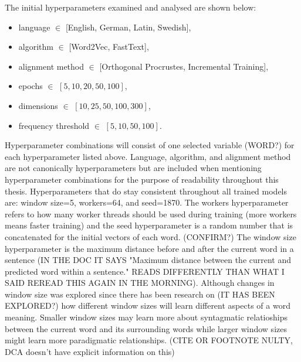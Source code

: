 


The initial hyperparameters examined and analysed are shown below:
\begin{itemize}
    \item language $\in$ [English, German, Latin, Swedish],
    \item algorithm $\in$ [Word2Vec, FastText],
    \item alignment method $\in$ [Orthogonal Procrustes, Incremental Training],
    \item epochs $\in$ $[5, 10, 20, 50, 100]$,
    \item dimensions $\in$ $[10, 25, 50, 100, 300]$,
    \item frequency threshold $\in$ $[5, 10, 50, 100]$.
\end{itemize}%


Hyperparameter combinations will consist of one selected variable (WORD?) for each hyperparameter listed above. Language, algorithm, and alignment method are not canonically hyperparameters but are included when mentioning hyperparameter combinations for the purpose of readability throughout this thesis. Hyperparameters that do stay consistent throughout all trained models are: window size=5, workers=64, and seed=1870. The workers hyperparameter refers to how many worker threads should be used during training (more workers means faster training) and the seed hyperparameter is a random number that is concatenated for the initial vectors of each word. (CONFIRM?) The window size hyperparameter is the maximum distance before and after the current word in a sentence (IN THE DOC IT SAYS "Maximum distance between the current and predicted word within a sentence." READS DIFFERENTLY THAN WHAT I SAID REREAD THIS AGAIN IN THE MORNING). Although changes in window size was explored since there has been research on (IT HAS BEEN EXPLORED?) how different window sizes will learn different aspects of a word meaning. Smaller window sizes may learn more about syntagmatic relatioships between the current word and its surrounding words while larger window sizes might learn more paradigmatic relationships. (CITE OR FOOTNOTE NULTY, DCA doesn't have explicit information on this)


